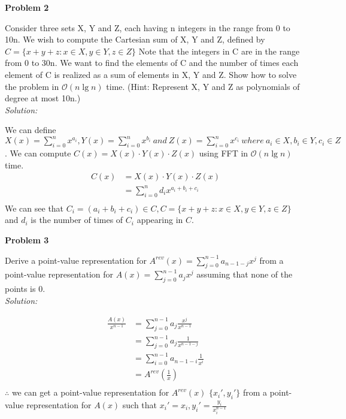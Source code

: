 \documentclass[12pt,letterpaper]{article}
\def\pp{\par\noindent}
\newcommand{\problem}[1]{ \bigskip \pp \textbf{Problem #1}\par}
\newcommand{\solution}{\textit{Solution:}\par}
\begin{document}
\problem{2}
Consider three sets X, Y and Z, each having n integers in the range from 0 to 10n. We wish to compute the Cartesian sum of X, Y and Z, defined by
$ C = \{ x + y + z : x \in X, y \in Y, z \in Z\}$
Note that the integers in C are in the range from 0 to 30n. We want to find the elements of C and the number of times each element of C is realized as a sum of elements in X, Y and Z. Show how to solve the problem in $\mathcal{O}(n \lg n)$ time. (Hint: Represent X, Y and Z as polynomials of degree at most 10n.) \\
\solution
We can define $ X(x) = \sum\limits_{i=0}^n x^{a_i} , Y(x) = \sum\limits_{i=0}^n x^{b_i} \ and\  Z(x) = \sum\limits_{i=0}^n x^{c_i}\ where\  a_i \in X, b_i \in Y, c_i \in Z$.
We can compute $C(x) = X(x) \cdot Y(x) \cdot Z(x)$ using FFT in $\mathcal{O}(n \lg n)$ time.
\begin{align*}
C(x) &= X(x) \cdot Y(x) \cdot Z(x) \\
&= \sum\limits_{i=0} ^{n} d_i x^{a_i+b_i+c_i} \\
\end{align*}
We can see that $C_i = (a_i+b_i+c_i) \in C, C = \{ x + y + z : x \in X, y \in Y, z \in Z\}$ and $d_i$ is the number of times of $C_i$ appearing in $C$.

\problem{3}
Derive a point-value representation for $A^{rev}(x) = \sum\limits_{j=0}^{n-1}a_{n-1-j}x^{j}$ from a point-value representation for $A(x) = \sum\limits_{j=0}^{n-1}a_{j}x^{j}$ assuming that none of the points is 0. \\
\solution
\begin{align*}
\frac{A(x)}{x^{n-1}} &= \sum\limits_{j=0}^{n-1} a_j \frac{x^j}{x^{n-1}} \\
&= \sum\limits_{j=0}^{n-1} a_j \frac{1}{x^{n-1-j}} \\
&= \sum\limits_{i=0}^{n-1} a_{n-1-i} \frac{1}{x^i} \\
&= A^{rev}(\frac{1}{x}) \\
\end{align*}
$\therefore$ we can get a point-value representation for $A^{rev}(x)$ $\{x_i',y_i'\}$ from a point-value representation for $A(x)$ such that $ x_i' = x_i, y_i' = \frac{y_i}{x_i^{n-1}}$ \\
\end{document}
